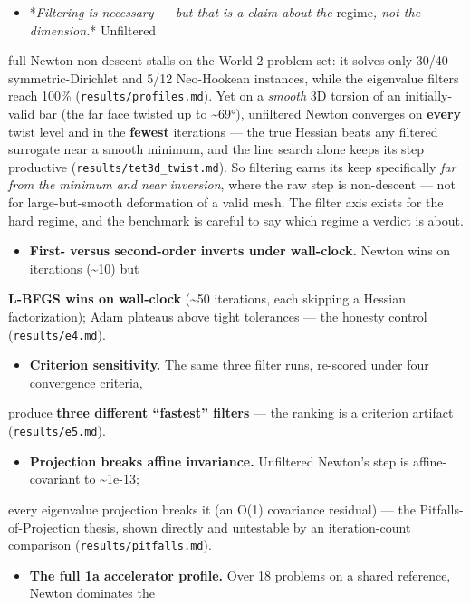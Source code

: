 \documentclass{egpubl}
\begin{document}
\begin{itemize}
  \item *\emph{Filtering is necessary --- but that is a claim about the }regime\emph{, not the dimension.}* Unfiltered
\end{itemize}
  full Newton non-descent-stalls on the World-2 problem set: it solves only 30/40 symmetric-Dirichlet
  and 5/12 Neo-Hookean instances, while the eigenvalue filters reach 100\% (\texttt{results/profiles.md}). Yet
  on a \emph{smooth} 3D torsion of an initially-valid bar (the far face twisted up to \textasciitilde{}69°), unfiltered
  Newton converges on \textbf{every} twist level and in the \textbf{fewest} iterations --- the true Hessian beats
  any filtered surrogate near a smooth minimum, and the line search alone keeps its step productive
  (\texttt{results/tet3d\_twist.md}). So filtering earns its keep specifically \emph{far from the minimum and near
  inversion}, where the raw step is non-descent --- not for large-but-smooth deformation of a valid mesh.
  The filter axis exists for the hard regime, and the benchmark is careful to say which regime a
  verdict is about.
\begin{itemize}
  \item \textbf{First- versus second-order inverts under wall-clock.} Newton wins on iterations (\textasciitilde{}10) but
\end{itemize}
  \textbf{L-BFGS wins on wall-clock} (\textasciitilde{}50 iterations, each skipping a Hessian factorization); Adam plateaus
  above tight tolerances --- the honesty control (\texttt{results/e4.md}).
\begin{itemize}
  \item \textbf{Criterion sensitivity.} The same three filter runs, re-scored under four convergence criteria,
\end{itemize}
  produce \textbf{three different ``fastest'' filters} --- the ranking is a criterion artifact
  (\texttt{results/e5.md}).
\begin{itemize}
  \item \textbf{Projection breaks affine invariance.} Unfiltered Newton's step is affine-covariant to \textasciitilde{}1e-13;
\end{itemize}
  every eigenvalue projection breaks it (an O(1) covariance residual) --- the Pitfalls-of-Projection
  thesis, shown directly and untestable by an iteration-count comparison (\texttt{results/pitfalls.md}).
\begin{itemize}
  \item \textbf{The full 1a accelerator profile.} Over 18 problems on a shared reference, Newton dominates the
\end{itemize}
\end{document}
